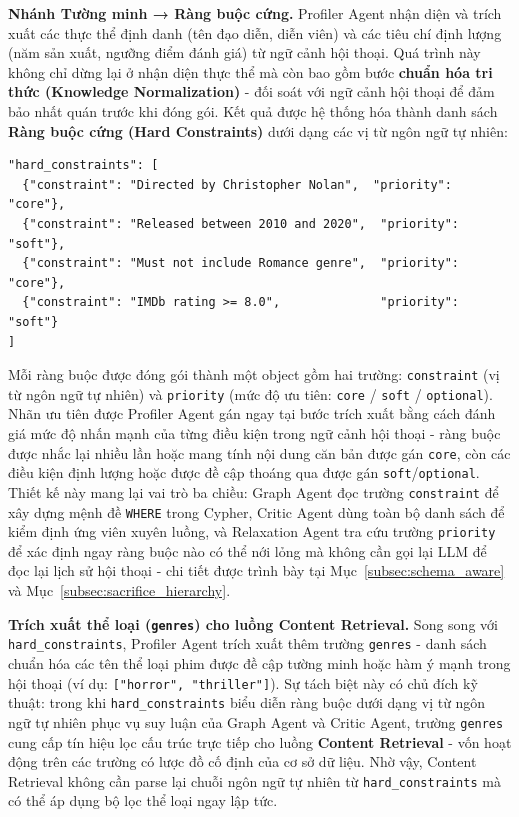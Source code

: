 \textbf{Nhánh Tường minh → Ràng buộc cứng.} Profiler Agent nhận diện và trích xuất các thực thể định danh (tên đạo diễn, diễn viên) và các tiêu chí định lượng (năm sản xuất, ngưỡng điểm đánh giá) từ ngữ cảnh hội thoại. Quá trình này không chỉ dừng lại ở nhận diện thực thể mà còn bao gồm bước \textbf{chuẩn hóa tri thức (Knowledge Normalization)} - đối soát với ngữ cảnh hội thoại để đảm bảo nhất quán trước khi đóng gói. Kết quả được hệ thống hóa thành danh sách \textbf{Ràng buộc cứng (Hard Constraints)} dưới dạng các vị từ ngôn ngữ tự nhiên:

\begin{verbatim}
"hard_constraints": [
  {"constraint": "Directed by Christopher Nolan",  "priority": "core"},
  {"constraint": "Released between 2010 and 2020",  "priority": "soft"},
  {"constraint": "Must not include Romance genre",  "priority": "core"},
  {"constraint": "IMDb rating >= 8.0",              "priority": "soft"}
]
\end{verbatim}

Mỗi ràng buộc được đóng gói thành một object gồm hai trường: \texttt{constraint} (vị từ ngôn ngữ tự nhiên) và \texttt{priority} (mức độ ưu tiên: \texttt{core} / \texttt{soft} / \texttt{optional}). Nhãn ưu tiên được Profiler Agent gán ngay tại bước trích xuất bằng cách đánh giá mức độ nhấn mạnh của từng điều kiện trong ngữ cảnh hội thoại - ràng buộc được nhắc lại nhiều lần hoặc mang tính nội dung căn bản được gán \texttt{core}, còn các điều kiện định lượng hoặc được đề cập thoáng qua được gán \texttt{soft}/\texttt{optional}. Thiết kế này mang lại vai trò ba chiều: Graph Agent đọc trường \texttt{constraint} để xây dựng mệnh đề \texttt{WHERE} trong Cypher, Critic Agent dùng toàn bộ danh sách để kiểm định ứng viên xuyên luồng, và Relaxation Agent tra cứu trường \texttt{priority} để xác định ngay ràng buộc nào có thể nới lỏng mà không cần gọi lại LLM để đọc lại lịch sử hội thoại - chi tiết được trình bày tại Mục~\ref{subsec:schema_aware} và Mục~\ref{subsec:sacrifice_hierarchy}.

\begin{sloppypar}
\textbf{Trích xuất thể loại (\texttt{genres}) cho luồng Content Retrieval.} Song song với \texttt{hard\_constraints}, Profiler Agent trích xuất thêm trường \texttt{genres} - danh sách chuẩn hóa các tên thể loại phim được đề cập tường minh hoặc hàm ý mạnh trong hội thoại (ví dụ: \texttt{["horror", "thriller"]}). Sự tách biệt này có chủ đích kỹ thuật: trong khi \texttt{hard\_constraints} biểu diễn ràng buộc dưới dạng vị từ ngôn ngữ tự nhiên phục vụ suy luận của Graph Agent và Critic Agent, trường \texttt{genres} cung cấp tín hiệu lọc cấu trúc trực tiếp cho luồng \textbf{Content Retrieval} - vốn hoạt động trên các trường có lược đồ cố định của cơ sở dữ liệu. Nhờ vậy, Content Retrieval không cần parse lại chuỗi ngôn ngữ tự nhiên từ \texttt{hard\_constraints} mà có thể áp dụng bộ lọc thể loại ngay lập tức.
\end{sloppypar}

